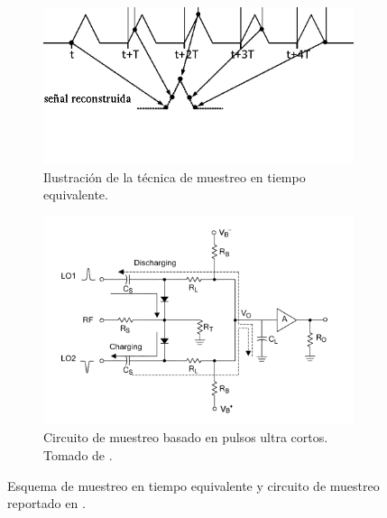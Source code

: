 \begin{figure}[t]
    \centering
    \begin{subfigure}[b]{0.45\textwidth}
        \centering
        \includegraphics[width=\textwidth]{images/Illustration-of-equivalent-time-sampling.png}
        \caption{Ilustración de la técnica de muestreo en tiempo equivalente.}
        \label{fig:Illustration_of_equivalent_time_sampling}
    \end{subfigure}
    \hfill
    \begin{subfigure}[b]{0.45\textwidth}
        \centering
        \includegraphics[width=\textwidth]{images/sampling_circuit.png}
        \caption{Circuito de muestreo basado en pulsos ultra cortos. Tomado de
        \cite{han2004}.}
        \label{fig:sampling_circuit}
    \end{subfigure}
    \caption{Esquema de muestreo en tiempo equivalente y circuito de muestreo
    reportado en \cite{han2004}.}
    \label{fig:equivalent_time_sampling_figures}
\end{figure}

